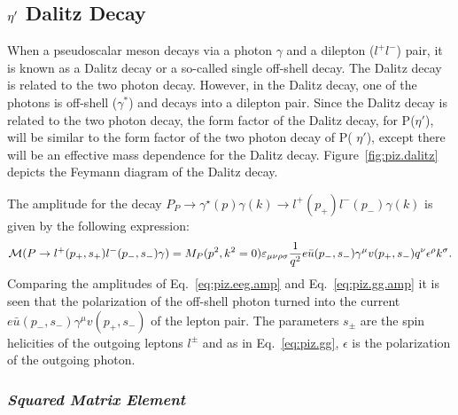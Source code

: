 \subsection{$\eta^{\prime}$ Dalitz Decay}\label{sec:dalitzdecay} 
When a pseudoscalar meson decays via a photon $\gamma$ and a dilepton ($l^{+}l^{-}$) pair, it is known as a Dalitz decay or a so-called single off-shell decay. The Dalitz decay is related to the two photon decay. However, in the Dalitz decay, one of the photons is off-shell ($\gamma^*$) and decays into a dilepton pair. Since the Dalitz decay is related to the two photon decay, the form factor of the Dalitz decay, for P($\eta'$), will be similar to the form factor of the two photon decay of P( $\eta'$), except there will be an effective mass dependence for the Dalitz decay. Figure~\ref{fig:piz.dalitz} depicts the Feymann diagram of the Dalitz decay.

The amplitude for the decay $P_P \to \gamma^\star(p) \gamma(k) \to l^+(p_+)l^-(p_-) \gamma(k)$ is given by the following expression:
\begin{equation}\label{eq:piz.eeg.amp}
{\cal M}(P\to l^+(p_+,s_+)l^-(p_-,s_-) \gamma) = {M}_P(p^2,k^2=0) \varepsilon_{\mu\nu\rho\sigma} \frac{1}{q^2} e \bar u(p_-,s_-) \gamma^\mu v(p_+,s_-) q^\nu \epsilon^\rho k^\sigma.
\end{equation}
Comparing the amplitudes of Eq.~\ref{eq:piz.eeg.amp} and Eq.~\ref{eq:piz.gg.amp} it is seen that the polarization of the off-shell photon turned into the current $e \bar u(p_-,s_-) \gamma^\mu v(p_+,s_-)$ of the lepton pair. The parameters $s_\pm$ are the spin helicities of the outgoing leptons $l^\pm$ and as in  Eq.~\ref{eq:piz.gg}, $\epsilon$ is the polarization of the outgoing photon. 
%
\subsubsection{\emph{Squared Matrix Element}}


